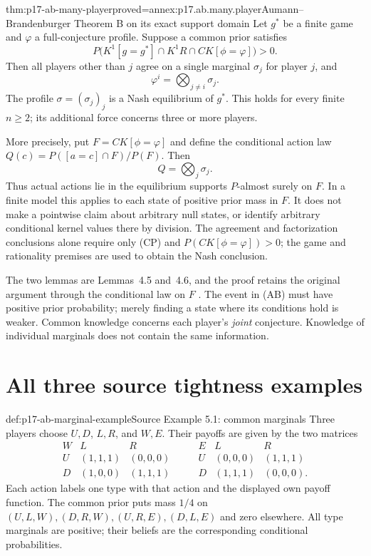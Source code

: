 \begin{hbtheorem}{thm:p17-ab-many-player}{proved=annex:p17.ab.many.player}{Aumann--Brandenburger Theorem B on its exact support domain}
Let \(g^*\) be a finite game and \(\varphi\) a full-conjecture profile.
Suppose a common prior satisfies
\[
 P\bigl(K^1[g=g^*]\cap K^1R\cap CK[\phi=\varphi]\bigr)>0 .
 \tag{AB}
\]
Then all players other than \(j\) agree on a single marginal
\(\sigma_j\) for player \(j\), and
\[
               \varphi^i=\bigotimes_{j\ne i}\sigma_j .
\]
The profile \(\sigma=(\sigma_j)_j\) is a Nash equilibrium of \(g^*\).
This holds for every finite \(n\geq2\); its additional force concerns
three or more players.

More precisely, put \(F=CK[\phi=\varphi]\) and define the conditional
action law \(Q(c)=P([a=c]\cap F)/P(F)\). Then
\[
                   Q=\bigotimes_j\sigma_j .
\]
Thus actual actions lie in the equilibrium supports \(P\)-almost
surely on \(F\). In a finite model this applies to each state of
positive prior mass in \(F\). It does not make a pointwise claim
about arbitrary null states, or identify arbitrary conditional
kernel values there by division.
The agreement and factorization conclusions alone require only (CP)
and \(P(CK[\phi=\varphi])>0\); the game and rationality premises
are used to obtain the Nash conclusion.
\end{hbtheorem}

The two lemmas are Lemmas~4.5 and~4.6, and the proof retains the
original argument through the conditional law on \(F\)
\parencite[pp.~1168--1170]{AumannBrandenburger1995Epistemic}.
The event in (AB) must have positive prior probability; merely
finding a state where its conditions hold is weaker. Common knowledge
concerns each player's \emph{joint} conjecture. Knowledge of individual
marginals does not contain the same information.

\section{All three source tightness examples}

\begin{hbdefinition}{def:p17-ab-marginal-example}{Source Example 5.1: common marginals}
Three players choose \(U,D\), \(L,R\), and \(W,E\). Their payoffs
are given by the two matrices
\[
 \begin{array}{c|cc}
 W&L&R\\\hline U&(1,1,1)&(0,0,0)\\D&(1,0,0)&(1,1,1)
 \end{array}
 \qquad
 \begin{array}{c|cc}
 E&L&R\\\hline U&(0,0,0)&(1,1,1)\\D&(1,1,1)&(0,0,0).
 \end{array}
\]
Each action labels one type with that action and the displayed
own payoff function. The common prior puts mass \(1/4\) on
\((U,L,W),(D,R,W),(U,R,E),(D,L,E)\) and zero elsewhere.
All type marginals are positive; their beliefs are the corresponding
conditional probabilities.
\end{hbdefinition}

